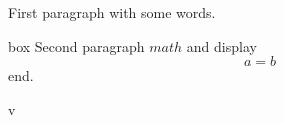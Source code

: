 \hsize=3in
First paragraph with some words.\par
\hbox{box} Second paragraph $math$ and display $$a=b$$ end.\par
\vbox{v} \bye
